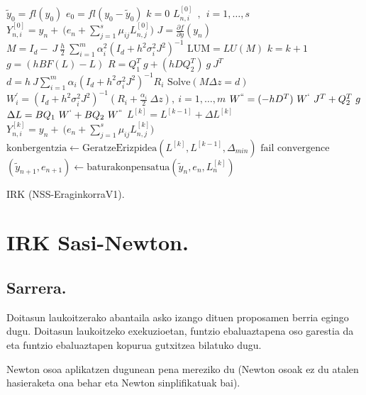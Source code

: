\begin{algorithm}[h!]
 \BlankLine
  $\tilde{y}_0=fl(y_0)$\;
  $e_0=fl(y_0-\tilde{y}_0)$\;
  {
   \BlankLine
   $k=0$\;
     $L_{n,i}^{[0]} \ \ , \ \ i=1,\dots,s $\;
   $Y_{n,i}^{[0]}=y_{n} + \ \big(e_n+\sum\limits_{j=1}^{s} \mu_{ij} L_{n,j}^{[0]}\big)  $\; 
   \BlankLine
   $J=\frac{\partial f}{\partial y}(y_n) $\; 
   \BlankLine
   $ M=I_d- \ J \ \frac{h}{2}\ \sum\limits_{i=1}^{m} \alpha_i^2 (I_d+h^2 \sigma_i^2 J^2)^{-1} $\;
   $ \text{LUM}=LU(M)$\;
   \BlankLine  
   {
    \BlankLine 
    $k=k+1$\;
    \BlankLine
    $g= (hB F(L)-L )$\;
    \BlankLine
    $R=Q_1^T \ g  + (h D Q_2^T) \ g \ J^T $\;
    $d=h \ J \sum\limits_{i=1}^{m}\alpha_i (I_d+h^2\sigma_i^2J^2)^{-1}R_i$\;
    $\text{Solve}(M \Delta z = d)$\;
    \BlankLine 
    $W^{'}_i=(I_d+h^2\sigma_i^2J^2)^{-1} (R_i+\frac{\alpha_i}{2} \ \Delta z), \ i=1,\dots,m$\;
    \BlankLine
    $W^{``}= (-hD^T) \ W^{`} \ J^T+Q_2^T \ g$\;
    \BlankLine
    $\Delta L =B Q_1 \ W^{`}+B Q_2 \ W^{``} $\;
    $L^{[k]}=L^{[k-1]}+\Delta L^{[k]}$\;
    $Y_{n,i}^{[k]}=y_{n} + \ \big(e_n+\sum\limits_{j=1}^{s} \mu_{ij} L_{n,j}^{[k]}\big)  $\;  
    $\text{konbergentzia} \leftarrow \text{GeratzeErizpidea}(L^{[k]},L^{[k-1]},\Delta_{min}) $\;
   }
 \BlankLine
   {
    {$\text{fail convergence}$\;}
   }
   $(\tilde y_{n+1}, e_{n+1})\leftarrow \text{baturakonpensatua}(\tilde y_{n},e_{n},L_{n}^{[k]})$\;
 }
 \caption{IRK (NSS-EraginkorraV1).}
 \label{alg:IRK-Newton-Li}
\end{algorithm}


\clearpage


\section{IRK Sasi-Newton.}


\subsection*{Sarrera.}

Doitasun laukoitzerako abantaila asko izango dituen proposamen berria egingo dugu. Doitasun laukoitzeko exekuzioetan, funtzio ebaluaztapena oso garestia da eta funtzio ebaluaztapen kopurua gutxitzea bilatuko dugu.

Newton osoa aplikatzen dugunean pena mereziko du (Newton osoak ez du atalen hasieraketa ona behar eta Newton sinplifikatuak bai).

